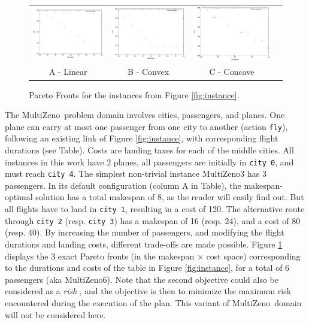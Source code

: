 \documentclass{article}
\def\MULTIZENO{{\sc MultiZeno}}
\begin{document}
\begin{figure}[tb]
\hskip -0.5cm
\begin{tabular}{cccc}
\includegraphics[width=0.32\columnwidth]{../plot_archive/zeno6e10.eps} &
\includegraphics[width=0.32\columnwidth]{../plot_archive/zeno6di.eps} &
\includegraphics[width=0.32\columnwidth]{../plot_archive/zeno6sc.eps}\\
A - Linear & B - Convex & C - Concave %
\end{tabular}
\caption{Pareto Fronts for the instances from Figure \ref{fig:instance}.}
\label{fig:allParetoFronts}
\end{figure}

The \MULTIZENO\ problem domain involves cities, passengers, and planes. One plane can carry at most one passenger from one city to another (action {\tt fly}), following an existing link of Figure \ref{fig:instance}, with corresponding flight durations (see Table). Costs are landing taxes for each of the middle cities. All instances in this work have 2 planes, all passengers are initially in {\tt city 0}, and must reach {\tt city 4}. The simplest non-trivial instance \MULTIZENO3 has 3 passengers. In its default configuration (column A in Table), the makespan-optimal solution has a total makespan of 8, as the reader will easily find out. But all flights have to land in {\tt city 1}, resulting in a cost of 120. The alternative route through  {\tt city 2} (resp. {\tt city 3}) has a makespan of 16 (resp. 24), and a cost of 80 (resp. 40). By increasing the number of passengers, and modifying the flight durations and landing costs, different trade-offs are made possible. Figure \ref{fig:allParetoFronts} displays 
the 3 exact Pareto fronts (in the makespan $\times$ cost space) corresponding to the durations and costs of the table in Figure \ref{fig:instance}, for a total of 6 passengers (aka \MULTIZENO6). 
Note that the second objective could also be considered as a {\em risk} \cite{nous-emo2013}, and the objective is then to minimize the maximum risk encountered during the execution of the plan. This variant of \MULTIZENO\ domain will not be considered here.
\end{document}
